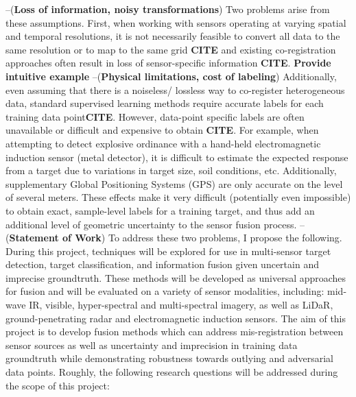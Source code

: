 \newline \vspace{1cm} \noindent --(\textbf{Loss of information, noisy transformations}) \newline
Two problems arise from these assumptions.  First, when working with sensors operating at varying spatial and temporal resolutions, it is not necessarily feasible to convert all data to the same resolution or to map to the same grid \textbf{CITE} and existing co-registration approaches often result in loss of sensor-specific information \textbf{CITE}.  \textbf{Provide intuitive example}   
\newline 
\vspace{1cm}\noindent --(\textbf{Physical limitations, cost of labeling}) \newline
Additionally, even assuming that there is a noiseless/ lossless way to co-register heterogeneous data, standard supervised learning methods require accurate labels for each training data point\textbf{CITE}.  However, data-point specific labels are often unavailable or difficult and expensive to obtain \textbf{CITE}.  For example, when attempting to detect explosive ordinance with a hand-held electromagnetic induction sensor (metal detector), it is difficult to estimate the expected response from a target due to variations in target size, soil conditions, etc.   Additionally, supplementary Global Positioning Systems (GPS) are only accurate on the level of several meters. These effects make it very difficult (potentially even impossible) to obtain exact, sample-level labels for a training target, and thus add an additional level of geometric uncertainty to the sensor fusion process.  
\newline
\vspace{1cm}\noindent --(\textbf{Statement of Work}) \newline
To address these two problems, I propose the following.  During this project, techniques will be explored for use in multi-sensor target detection, target classification, and information fusion given uncertain and imprecise groundtruth.  These methods will be developed as universal approaches for fusion and will be evaluated on a variety of sensor modalities, including: mid-wave IR, visible, hyper-spectral and multi-spectral imagery, as well as LiDaR, ground-penetrating radar and electromagnetic induction sensors.  The aim of this project is to develop fusion methods which can address mis-registration between sensor sources as well as uncertainty and imprecision in training data groundtruth while demonstrating robustness towards outlying and adversarial data points. Roughly, the following research questions will be addressed during the scope of this project:
